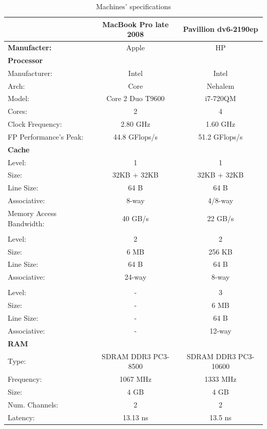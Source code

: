 \documentclass[twoside]{article}
\begin{document}
\begin{multicols}{2}
\begin{center}
\begin{table}[htb]
	{\small
		\begin{tabular}{|l|c|c|}
			\hline 
			 & MacBook Pro late 2008 & Pavillion dv6-2190ep \\
			\hline
			\textbf{Manufacter:} & Apple & HP \\
			\textbf{Processor} & & \\
			Manufacturer: & Intel & Intel \\
			Arch: & Core & Nehalem \\
			Model: & Core 2 Duo T9600 & i7-720QM \\
			Cores: & 2 & 4 \\
			Clock Frequency: & 2.80 GHz & 1.60 GHz \\
			FP Performance's Peak: & 44.8 GFlops/s & 51.2 GFlops/s \\
			\hline 
			\textbf{Cache} & & \\
			Level: & 1 & 1\\
			Size: & 32KB + 32KB & 32KB + 32KB \\
			Line Size: & 64 B & 64 B \\
			Associative: & 8-way & 4/8-way \\
			Memory Access Bandwidth: & 40 GB/s & 22 GB/s \\
			 & & \\
			Level: & 2 & 2 \\
			Size: & 6 MB & 256 KB \\
			Line Size: & 64 B & 64 B \\
			Associative: & 24-way & 8-way \\
			 & & \\
			Level: & - & 3 \\
			Size: & - & 6 MB \\
			Line Size: & - & 64 B \\
			Associative: & - & 12-way \\
			\hline 
			\textbf{RAM} & & \\
			Type: & SDRAM DDR3 PC3-8500 & SDRAM DDR3 PC3-10600 \\
			Frequency: & 1067 MHz & 1333 MHz \\
			Size: & 4 GB & 4 GB \\
			Num. Channels: & 2 & 2 \\
			Latency: & 13.13 ns & 13.5 ns \\
			\hline
		\end{tabular}
		}
		\caption{Machines' specifications}\label{tab:specs}
\end{table}
\end{center}


\end{multicols}
\end{document}
